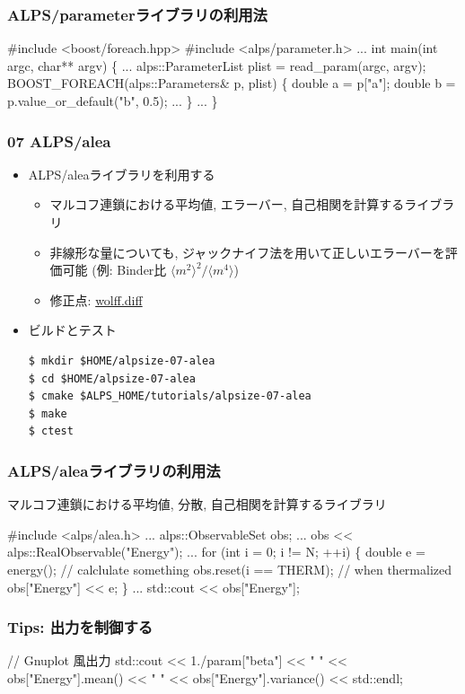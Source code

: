 \begin{frame}[fragile,shrink=5] \frametitle{ALPS/parameterライブラリの利用法}
\begin{semiverbatim}
#include <boost/foreach.hpp>
#include <alps/parameter.h>
...
int main(int argc, char** argv) \{
...
  alps::ParameterList plist = read_param(argc, argv);
  BOOST_FOREACH(alps::Parameters& p, plist) \{
    \alert<1>{double a = p["a"];}
    \alert<2>{double b = p.value_or_default("b", 0.5);}
...
  \}
...
\}
\end{semiverbatim}
\end{frame}

\begin{frame}[fragile]
  \frametitle{07 ALPS/alea}
  \begin{itemize}
    \item ALPS/aleaライブラリを利用する
      \begin{itemize}
        \item マルコフ連鎖における平均値, エラーバー, 自己相関を計算するライブラリ
        \item 非線形な量についても, ジャックナイフ法を用いて正しいエラーバーを評価可能 (例: Binder比 $\langle m^2 \rangle^2 / \langle m^4 \rangle$)
        \item 修正点: \href{https://github.com/cmsi/alps-tutorial/blob/develop/alpsize/07-wolff.diff}{wolff.diff}
      \end{itemize}
    \item ビルドとテスト
\begin{lstlisting}
$ mkdir $HOME/alpsize-07-alea
$ cd $HOME/alpsize-07-alea
$ cmake $ALPS_HOME/tutorials/alpsize-07-alea
$ make
$ ctest
\end{lstlisting}
  \end{itemize}
\end{frame}

\begin{frame}[fragile,shrink=10] \frametitle{ALPS/aleaライブラリの利用法}
  マルコフ連鎖における平均値, 分散, 自己相関を計算するライブラリ
\begin{semiverbatim}
#include <alps/alea.h>
...
alps::ObservableSet obs;
...
obs << alps::RealObservable("Energy");
...
for (int i = 0; i != N; ++i) \{
  double e = energy(); // calclulate something
  obs.reset(i == THERM); // when thermalized
  obs["Energy"] << e;
\}
...
std::cout << obs["Energy"];
\end{semiverbatim}
\end{frame}

\begin{frame}[fragile,shrink=10] \frametitle{Tips: 出力を制御する}
\begin{semiverbatim}
// Gnuplot 風出力
std::cout << 1./param["beta"] << " "
          << obs["Energy"].mean() << " "
          << obs["Energy"].variance() << std::endl;
\end{semiverbatim}
\end{frame}


